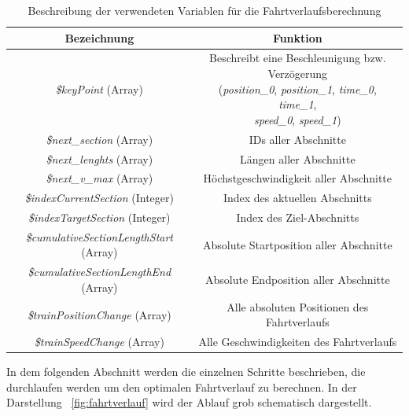 \begin{table}
\begin{center}
\renewcommand{\arraystretch}{1.2}
\begin{tabular}{c|c}
Bezeichnung & Funktion \\ \hline
\textit{\$keyPoint} (Array)                   &   \makecell{Beschreibt eine Beschleunigung bzw. Verzögerung \\(\textit{position\_0}, \textit{position\_1}, \textit{time\_0}, \textit{time\_1}, \\ \textit{speed\_0}, \textit{speed\_1})}           \\ \hline
\textit{\$next\_section} (Array)                  &    IDs aller Abschnitte                  \\ \hline
\textit{\$next\_lenghts} (Array)                  &    Längen aller Abschnitte                  \\ \hline
\textit{\$next\_v\_max} (Array)                  &    Höchstgeschwindigkeit aller Abschnitte                  \\ \hline
\textit{\$indexCurrentSection} (Integer)                  &    Index des aktuellen Abschnitts               \\ \hline
\textit{\$indexTargetSection} (Integer)                  &    Index des Ziel-Abschnitts                  \\ \hline
\textit{\$cumulativeSectionLengthStart} (Array)                  &    Absolute Startposition aller Abschnitte                  \\ \hline
\textit{\$cumulativeSectionLengthEnd} (Array)                  &    Absolute Endposition aller Abschnitte                  \\ \hline
\textit{\$trainPositionChange} (Array)                  &    Alle absoluten Positionen des Fahrtverlaufs                  \\ \hline
\textit{\$trainSpeedChange} (Array)                  &   Alle Geschwindigkeiten des Fahrtverlaufs                  \\
\end{tabular}
\renewcommand{\arraystretch}{1}
\caption{Beschreibung der verwendeten Variablen für die Fahrtverlaufsberechnung}
\label{table:vars}
\end{center}
\end{table}

In dem folgenden Abschnitt werden die einzelnen Schritte beschrieben, die durchlaufen werden um den optimalen Fahrtverlauf zu berechnen. In der Darstellung ~\ref{fig:fahrtverlauf} wird der Ablauf grob schematisch dargestellt.

